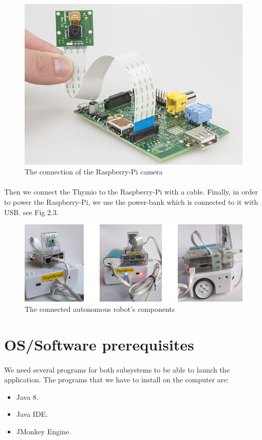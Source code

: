 \documentclass[12pt]{report}
\begin{document}
\begin{figure}[H]
	\begin{center}
		\includegraphics[scale=0.8]{res/campirasp.png}
		\caption{The connection of the Raspberry-Pi camera }
	\end{center}
\end{figure}
\paragraph{}
Then we connect the Thymio to the Raspberry-Pi with a cable. Finally, in order to power the Raspberry-Pi, we use the power-bank which is connected to it with USB. see Fig 2.3.
\begin{figure}[H]
	\begin{center}
		\includegraphics[scale=0.8]{res/robot_comp.png}
		\caption{The connected autonomous robot's components}
	\end{center}
\end{figure}
\section{OS/Software prerequisites}
\paragraph{}
We need several programs for both subsystems to be able to launch the application. The programs that we have to install on the computer are:
\begin{itemize}
	\item Java 8.
	\item Java IDE.
	\item JMonkey Engine.
\end{itemize}
\end{document}
